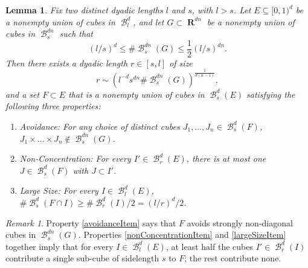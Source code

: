 \documentclass[dvipsnames,letterpaper,12pt]{article}
\numberwithin{equation}{section}
\theoremstyle{plain}
\newtheorem{lemma}{Lemma}
\theoremstyle{remark}
\newtheorem*{remark}{Remark}
\DeclareMathOperator{\RR}{\mathbf{R}}
\DeclareMathOperator{\B}{\mathcal{B}}
\begin{document}
\begin{lemma} \label{discretelemma}
	Fix two distinct dyadic lengths $l$ and $s$, with $l > s$. Let $E \subseteq [0,1)^d$ be a nonempty union of cubes in $\B^d_l$, and let $G\subset\RR^{dn}$ be a nonempty union of cubes in $\B_s^{dn}$ such that
	\begin{equation}\label{ZsLarge}
		(l/s)^d \leq \# \B^{dn}_s(G)  \leq \frac{1}{2}(l/s)^{dn}.
	\end{equation} 
	Then there exists a dyadic length $r \in [s,l]$ of size
	\begin{equation} \label{rBound}
	 	r \sim \left( l^{-d}s^{dn} \# \B^{dn}_s(G) \right)^{\frac{1}{d(n-1)}},
	\end{equation}
	and a set $F \subset E$ that is a nonempty union of cubes in $\B^d_s(E)$ satisfying the following three properties:
	\begin{enumerate}
		\item\label{avoidanceItem} \emph{Avoidance}: For any choice of distinct cubes $J_1, \dots, J_n \in \B^d_s(F)$, $J_1 \times \dots \times J_n \not \in \B_s^{dn}(G)$.

		\item\label{nonConcentrationItem} \emph{Non-Concentration}: For every $I' \in \B_r^d(E)$, there is at most one $J \in \B_s^d(F)$ with $J \subset I'$.

		\item\label{largeSizeItem} \emph{Large Size}: For every $I \in \B^d_l(E)$, $\# \B^d_s(F \cap I) \geq \# \B^d_r(I) / 2 = (l/r)^d / 2$.
	\end{enumerate}
\end{lemma}

\begin{remark}
	Property \ref{avoidanceItem} says that $F$ avoids strongly non-diagonal cubes in $\B^{dn}_s(G)$. Properties \ref{nonConcentrationItem} and \ref{largeSizeItem} together imply that for every $I \in \B^d_l(E)$, at least half the cubes $I'\in \B_r^d(I)$ contribute a single sub-cube of sidelength $s$ to $F$; the rest contribute none. 
\end{remark}
\end{document}

